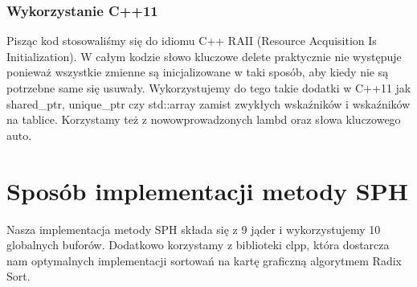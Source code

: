 \documentclass[polish, 12pt]{aghthesis}
\begin{document}
		\subsubsection{Wykorzystanie C++11}
		
		Pisząc kod stosowaliśmy się do idiomu C++ RAII (Resource Acquisition Is Initialization). W całym kodzie słowo kluczowe delete praktycznie nie występuje ponieważ wszystkie zmienne są inicjalizowane w taki sposób, aby kiedy nie są potrzebne same się usuwały. Wykorzystujemy do tego takie dodatki w C++11 jak shared\_ptr, unique\_ptr czy std::array zamist zwykłych wskaźników i wskaźników na tablice. Korzystamy też z nowowprowadzonych lambd oraz słowa kluczowego auto.

\section{Sposób implementacji metody SPH}
Nasza implementacja metody SPH składa się z 9 jąder i wykorzystujemy 10 globalnych buforów. Dodatkowo korzystamy z biblioteki clpp, która dostarcza nam optymalnych implementacji sortowań na kartę graficzną algorytmem Radix Sort.
\end{document}
